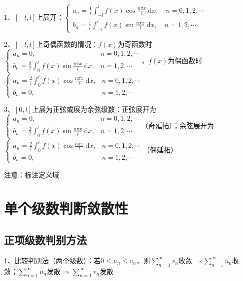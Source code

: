 1、$[-l, l]$上展开：$\left\{\begin{array}{l}

a_{n}=\frac{1}{l} \int_{-l}^{l} f(x) \cos \frac{n \pi x}{l} \mathrm{~d} x, \quad n=0,1,2, \cdots \\

b_{n}=\frac{1}{l} \int_{-l}^{l} f(x) \sin \frac{n \pi x}{l} \mathrm{~d} x, \quad n=1,2, \cdots

\end{array}\right.$

2、$[-l, l]$上奇偶函数的情况：$f(x)$为奇函数时$\begin{cases}a_{n}=0, & n=0,1,2, \cdots \\ b_{n}=\frac{2}{l} \int_{0}^{l} f(x) \sin \frac{n \pi x}{l} \mathrm{~d} x, & n=1,2, \cdots\end{cases}$，$f(x)$为偶函数时$\begin{cases}a_{n}=\frac{2}{l} \int_{0}^{l} f(x) \cos \frac{n \pi x}{l} \mathrm{~d} x, & n=0,1,2, \cdots \\ b_{n}=0, & n=1,2, \cdots\end{cases}$

3、$[0, l]$上展为正弦或展为余弦级数：正弦展开为$\begin{cases}a_{n}=0, & n=0,1,2, \cdots \\ b_{n}=\frac{2}{l} \int_{0}^{l} f(x) \sin \frac{n \pi x}{l} \mathrm{~d} x, & n=1,2, \cdots\end{cases}$（奇延拓）；余弦展开为$\begin{cases}a_{n}=\frac{2}{l} \int_{0}^{l} f(x) \cos \frac{n \pi x}{l} \mathrm{~d} x, & n=0,1,2, \cdots \\ b_{n}=0, & n=1,2, \cdots\end{cases}$（偶延拓）

注意：标注定义域

\section{单个级数判断敛散性}



\subsection{正项级数判别方法}

1、比较判别法（两个级数）：若$0 \leqslant u_{n} \leqslant v_{n}$，则$\sum_{n=1}^{\infty} v_{n}$收敛$\Rightarrow \sum_{n=1}^{\infty} u_{n}$收敛；$\sum_{n=1}^{\infty} u_{n}$发散$\Rightarrow \sum_{n=1}^{\infty} v_{n}$发散

